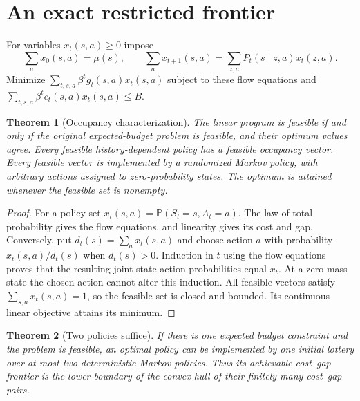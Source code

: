 \documentclass[11pt,a4paper]{article}
\newtheorem{theorem}{Theorem}[section]
\theoremstyle{definition}
\theoremstyle{remark}
\newcommand{\Prob}{\mathbb{P}}
\begin{document}
\section{An exact restricted frontier}
For variables $x_t(s,a)\ge0$ impose
\[
 \sum_a x_0(s,a)=\mu(s),\qquad
 \sum_a x_{t+1}(s,a)=\sum_{z,a}P_t(s\mid z,a)x_t(z,a).
\]
Minimize $\sum_{t,s,a}\beta^t g_t(s,a)x_t(s,a)$ subject to these flow equations and $\sum_{t,s,a}\beta^t c_t(s,a)x_t(s,a)\le B$.
\begin{theorem}[Occupancy characterization]
The linear program is feasible if and only if the original expected-budget problem is feasible, and their optimum values agree. Every feasible history-dependent policy has a feasible occupancy vector. Every feasible vector is implemented by a randomized Markov policy, with arbitrary actions assigned to zero-probability states. The optimum is attained whenever the feasible set is nonempty.
\end{theorem}
\begin{proof}
For a policy set $x_t(s,a)=\Prob(S_t=s,A_t=a)$. The law of total probability gives the flow equations, and linearity gives its cost and gap. Conversely, put $d_t(s)=\sum_a x_t(s,a)$ and choose action $a$ with probability $x_t(s,a)/d_t(s)$ when $d_t(s)>0$. Induction in $t$ using the flow equations proves that the resulting joint state-action probabilities equal $x_t$. At a zero-mass state the chosen action cannot alter this induction. All feasible vectors satisfy $\sum_{s,a}x_t(s,a)=1$, so the feasible set is closed and bounded. Its continuous linear objective attains its minimum.
\end{proof}
\begin{theorem}[Two policies suffice]
If there is one expected budget constraint and the problem is feasible, an optimal policy can be implemented by one initial lottery over at most two deterministic Markov policies. Thus its achievable cost--gap frontier is the lower boundary of the convex hull of their finitely many cost--gap pairs.
\end{theorem}
\end{document}
